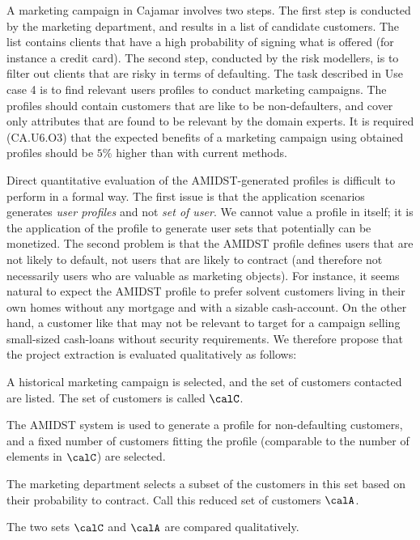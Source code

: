\documentclass{article}
\theoremstyle{theorem}
\theoremstyle{definition}
\begin{document}
A marketing campaign in Cajamar involves two steps.  The first step is conducted by the marketing department, and results in a list of candidate customers. 
The list contains clients that have a high probability of signing what is offered (for instance a credit card).  The second step, conducted by the risk modellers, is to filter out clients that are risky in terms of defaulting.
The task described in Use case 4 is to find relevant users profiles to conduct marketing campaigns. The profiles should contain customers that are like to be non-defaulters, and cover only attributes that are found to be relevant by the domain experts. It is required (CA.U6.O3) that the expected benefits of a marketing campaign using obtained profiles should be $5\%$ higher than with current methods. 

Direct quantitative evaluation of the AMIDST-generated profiles is difficult to perform in a formal way. The first issue is that the application scenarios generates \textit{user profiles} and not \textit{set of user}. 
We cannot value a profile in itself; it is the application of the profile to generate user sets that potentially can be monetized. The second problem is that the AMIDST profile defines users that are not likely to default, not users that are likely to contract (and therefore not necessarily users who are valuable as marketing objects). For instance, it seems natural to expect the AMIDST profile to prefer solvent customers living in their own homes without any mortgage and with a sizable cash-account. On the other hand, a customer like that may not be relevant to target for a campaign selling small-sized cash-loans without security requirements. We therefore propose that the project extraction is evaluated qualitatively as follows:

\bit
\item A historical marketing campaign is selected, and the set of customers contacted are listed. The set of customers is called $\calC$.
\item The AMIDST system is used to generate a profile for non-defaulting customers, and a fixed number of  customers fitting the profile (comparable to the number of elements in $\calC$) are selected.
\item The marketing department selects a subset of the customers in this set based on their probability to contract. Call this reduced set of customers $\calA$.
\item The two sets $\calC$ and $\calA$ are compared qualitatively.
\eit
\end{document}

